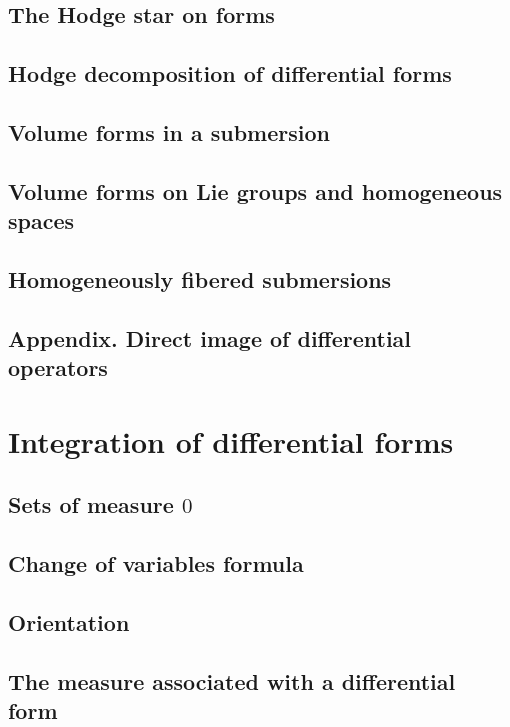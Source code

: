 \documentclass[a4paper]{article}
\begin{document}
\subsection{The Hodge star on forms}

\subsection{Hodge decomposition of differential forms}

\subsection{Volume forms in a submersion}

\subsection{Volume forms on Lie groups and homogeneous spaces}

\subsection{Homogeneously fibered submersions}

\subsection*{Appendix. Direct image of differential operators}

\section{Integration of differential forms}

\subsection{Sets of measure $0$}

\subsection{Change of variables formula}

\subsection{Orientation}

\subsection{The measure associated with a differential form}
\end{document}
